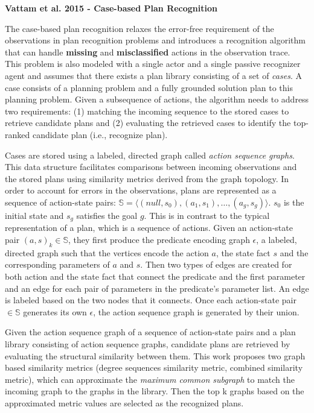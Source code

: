 \noindent\textbf{Vattam et al. 2015 - Case-based Plan Recognition}

The case-based plan recognition \cite{vattam2015case} relaxes the error-free requirement of the observations in plan recognition problems and introduces a recognition algorithm that can handle \textbf{missing} and \textbf{misclassified} actions in the observation trace. This problem is also modeled with a single actor and a single passive recognizer agent and assumes that there exists a plan library consisting of a set of \textit{cases}. A case consists of a planning problem and a fully grounded solution plan to this planning problem. Given a subsequence of actions, the algorithm needs to address two requirements: (1) matching the incoming sequence to the stored cases to retrieve candidate plans and (2) evaluating the retrieved cases to identify the top-ranked candidate plan (i.e., recognize plan).

Cases are stored using a labeled, directed graph called \textit{action sequence graphs}. This data structure facilitates comparisons between incoming observations and the stored plans using similarity metrics derived from the graph topology. In order to account for errors in the observations, plans are represented as a sequence of action-state pairs: $\mathbb{S}=\langle (null,s_0), (a_1, s_1), \ldots, (a_g,s_g)\rangle$. $s_0$ is the initial state and $s_g$ satisfies the goal $g$. This is in contrast to the typical representation of a plan, which is a sequence of actions. Given an action-state pair $(a,s)_k \in \mathbb{S}$, they first produce the predicate encoding graph $\epsilon$, a labeled, directed graph such that the vertices encode the action $a$, the state fact $s$ and the corresponding parameters of $a$ and $s$. Then two types of edges are created for both action and the state fact that connect the predicate and the first parameter and an edge for each pair of parameters in the predicate's parameter list. An edge is labeled based on the two nodes that it connects. Once each action-state pair $\in \mathbb{S}$ generates its own $\epsilon$, the action sequence graph is generated by their union.

Given the action sequence graph of a sequence of action-state pairs and a plan library consisting of action sequence graphs, candidate plans are retrieved by evaluating the structural similarity between them. This work proposes two graph based similarity metrics (degree sequences similarity metric, combined similarity metric), which can approximate the \textit{maximum common subgraph} to match the incoming graph to the graphs in the library. Then the top k graphs based on the approximated metric values are selected as the recognized plans.

